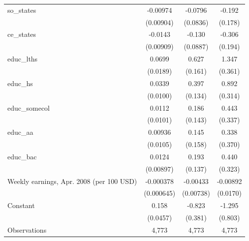 \begin{table}[htbp]
\begin{tabular}{l*{3}{c}}
\addlinespace
so\_states           &    -0.00974         &     -0.0796         &      -0.192         \\
                    &   (0.00904)         &    (0.0836)         &     (0.178)         \\
\addlinespace
ce\_states           &     -0.0143         &      -0.130         &      -0.306         \\
                    &   (0.00909)         &    (0.0887)         &     (0.194)         \\
\addlinespace
educ\_lths           &      0.0699\sym{***}&       0.627\sym{***}&       1.347\sym{***}\\
                    &    (0.0189)         &     (0.161)         &     (0.361)         \\
\addlinespace
educ\_hs             &      0.0339\sym{***}&       0.397\sym{***}&       0.892\sym{***}\\
                    &    (0.0100)         &     (0.134)         &     (0.314)         \\
\addlinespace
educ\_somecol        &      0.0112         &       0.186         &       0.443         \\
                    &    (0.0101)         &     (0.143)         &     (0.337)         \\
\addlinespace
educ\_aa             &     0.00936         &       0.145         &       0.338         \\
                    &    (0.0105)         &     (0.158)         &     (0.370)         \\
\addlinespace
educ\_bac            &      0.0124         &       0.193         &       0.440         \\
                    &   (0.00897)         &     (0.137)         &     (0.323)         \\
\addlinespace
Weekly earnings, Apr. 2008 (per 100 USD)&   -0.000378         &    -0.00433         &    -0.00892         \\
                    &  (0.000645)         &   (0.00738)         &    (0.0170)         \\
\addlinespace
Constant            &       0.158\sym{***}&      -0.823\sym{**} &      -1.295         \\
                    &    (0.0457)         &     (0.381)         &     (0.803)         \\
\midrule
Observations        &       4,773         &       4,773         &       4,773         \\

\end{tabular}
\end{table}
